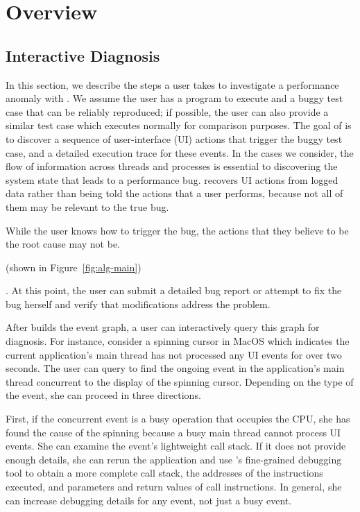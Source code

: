 \section{Overview} \label{sec:overview}

\subsection{Interactive Diagnosis} \label{subsec:debug}

In this section, we describe the steps a user takes to investigate a
performance anomaly with \xxx. We assume the user has a program to execute and
a buggy test case that can be reliably reproduced; if possible, the user can
also provide a similar test case which executes normally for comparison
purposes. The goal of \xxx is to discover a sequence of user-interface (UI)
actions that trigger the buggy test case, and a detailed execution trace for
these events. In the cases we consider, the flow of information across threads
and processes is essential to discovering the system state that leads to a
performance bug. \xxx recovers UI actions from logged data rather than being
told the actions that a user performs, because not all of them may be relevant
to the true bug.

While the user knows how to trigger
the bug, the actions that they believe to be the root cause may not be.

 (shown in Figure~\ref{fig:alg-main})


. At
this point, the user can submit a detailed bug report or attempt to fix the bug herself and verify that modifications address the problem.

After \xxx builds the event graph, a user can interactively query this graph
for diagnosis.  For instance, consider a spinning cursor in MacOS which
indicates the current application's main thread has not processed any UI events
for over two seconds.  The user can query \xxx to find the ongoing event in the
application's main thread concurrent to the display of the spinning cursor.
Depending on the type of the event, she can proceed in three directions.

First, if the concurrent event is a busy operation that occupies the CPU, she
has found the cause of the spinning because a busy main thread cannot process
UI events.  She can examine the event's lightweight call stack.  If it does not
provide enough details, she can rerun the application and use \xxx's
fine-grained debugging tool to obtain a more complete call stack, the addresses
of the instructions executed, and parameters and return values of call
instructions.  In general, she can increase debugging details for any event,
not just a busy event.

